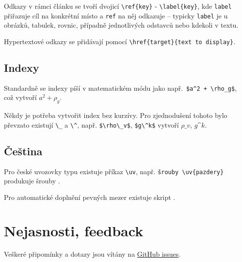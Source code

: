 \documentclass{cygclanek}
\begin{document}
Odkazy v rámci článku se tvoří dvojicí \verb|\ref{key}| - \verb|\label{key}|, kde \verb|label| přiřazuje 
cíl na konkrétní místo a \verb|ref| na něj odkazuje -- typicky \verb|label| je u obrázků, tabulek, rovnic, 
případně jednotlivých odstavců nebo kdekoli v textu.  

Hypertextové odkazy se přidávají pomocí \verb|\href{target}{text to display}|.

\subsection{Indexy}
Standardně se indexy píší v matematickém módu jako např.~\verb|$a^2 + \rho_g$|, což vytvoří $a^2 + \rho_g$. 

Někdy je potřeba vytvořit index bez kurzívy. Pro zjednodušení tohoto bylo převzato existují \verb|\_| 
a \verb|\^|, např. \verb|$\rho\_v$|, \verb|$g\^k$| vytvoří $\rho\_v$, $g\^k$. 


\subsection{Čeština}
Pro české uvozovky typu  existuje příkaz \verb|\uv|, např. \verb|šrouby \uv{pazdery}| produkuje 
šrouby .

Pro automatické doplnění pevných mezer existuje skript  \cite{vlna}.

\section{Nejasnosti, feedback}

Veškeré připomínky a dotazy jsou vítány na \href{https://github.com/rzehumat/cygMikulas/issues}{GitHub issues}.


\printbibliography[title={Literatura}]
\end{document}
